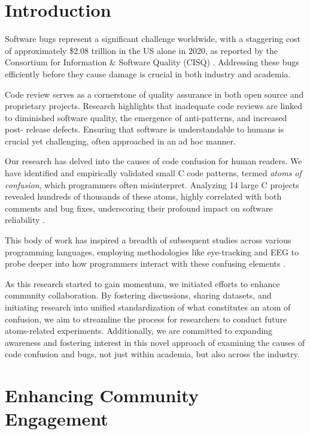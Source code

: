 \documentclass[conference]{IEEEtran}
\begin{document}
\section{Introduction}

Software bugs represent a significant challenge worldwide, 
with a staggering cost of approximately \$2.08 trillion in the 
US alone in 2020, as reported by the Consortium for 
Information \& Software Quality (CISQ) \cite{CPSQ2020}. 
Addressing these bugs efficiently before they cause damage is 
crucial in both industry and academia.

Code review serves as a cornerstone of quality assurance in 
both open source and proprietary projects. Research highlights 
that inadequate code reviews are linked to diminished software 
quality, the emergence of anti-patterns, and increased post-
release defects. Ensuring that software is understandable to 
humans is crucial yet challenging, often approached in an ad 
hoc manner.

Our research has delved into the causes of code confusion for 
human readers. We have identified and empirically validated 
small C code patterns, termed \emph{atoms of confusion}, which 
programmers often misinterpret. Analyzing 14 large C projects 
revealed hundreds of thousands of these atoms, highly 
correlated with both comments and bug fixes, underscoring 
their profound impact on software reliability 
\cite{gopstein2018prevalence}.

This body of work has inspired a breadth of subsequent studies 
across various programming languages, employing methodologies 
like eye-tracking and EEG to probe deeper into how programmers 
interact with these confusing elements 
\cite{langhout2021atoms, mendes2021bohr, mendes2022dazed, 
torres2023investigation, dacosta2023seeing, 
Manor2018AtomsConfusionSwift, yeh2017detecting}.

As this research started to gain momentum, we initiated 
efforts to enhance community collaboration. By fostering 
discussions, sharing datasets, and initiating research into 
unified standardization of what constitutes an atom of 
confusion, we aim to streamline the process for researchers to 
conduct future atoms-related experiments. Additionally, we are 
committed to expanding awareness and fostering interest in 
this novel approach of examining the causes of code confusion 
and bugs, not just within academia, but also across the 
industry.


\section{ Enhancing Community Engagement}
\end{document}
